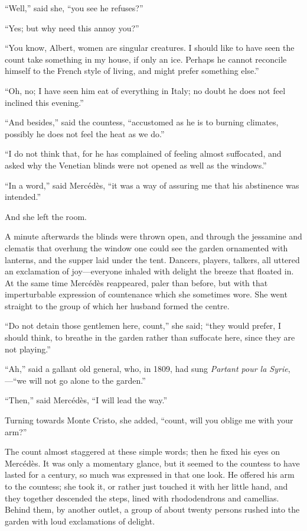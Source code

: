 “Well,” said she, “you see he refuses?”

“Yes; but why need this annoy you?”

“You know, Albert, women are singular creatures. I should like to have
seen the count take something in my house, if only an ice. Perhaps he
cannot reconcile himself to the French style of living, and might
prefer something else.”

“Oh, no; I have seen him eat of everything in Italy; no doubt he does
not feel inclined this evening.”

“And besides,” said the countess, “accustomed as he is to burning
climates, possibly he does not feel the heat as we do.”

“I do not think that, for he has complained of feeling almost
suffocated, and asked why the Venetian blinds were not opened as well
as the windows.”

“In a word,” said Mercédès, “it was a way of assuring me that his
abstinence was intended.”

And she left the room.

A minute afterwards the blinds were thrown open, and through the
jessamine and clematis that overhung the window one could see the
garden ornamented with lanterns, and the supper laid under the tent.
Dancers, players, talkers, all uttered an exclamation of joy—everyone
inhaled with delight the breeze that floated in. At the same time
Mercédès reappeared, paler than before, but with that imperturbable
expression of countenance which she sometimes wore. She went straight
to the group of which her husband formed the centre.

“Do not detain those gentlemen here, count,” she said; “they would
prefer, I should think, to breathe in the garden rather than suffocate
here, since they are not playing.”

“Ah,” said a gallant old general, who, in 1809, had sung \textit{Partant pour
la Syrie},—“we will not go alone to the garden.”

“Then,” said Mercédès, “I will lead the way.”

Turning towards Monte Cristo, she added, “count, will you oblige me
with your arm?”

The count almost staggered at these simple words; then he fixed his
eyes on Mercédès. It was only a momentary glance, but it seemed to the
countess to have lasted for a century, so much was expressed in that
one look. He offered his arm to the countess; she took it, or rather
just touched it with her little hand, and they together descended the
steps, lined with rhododendrons and camellias. Behind them, by another
outlet, a group of about twenty persons rushed into the garden with
loud exclamations of delight.

